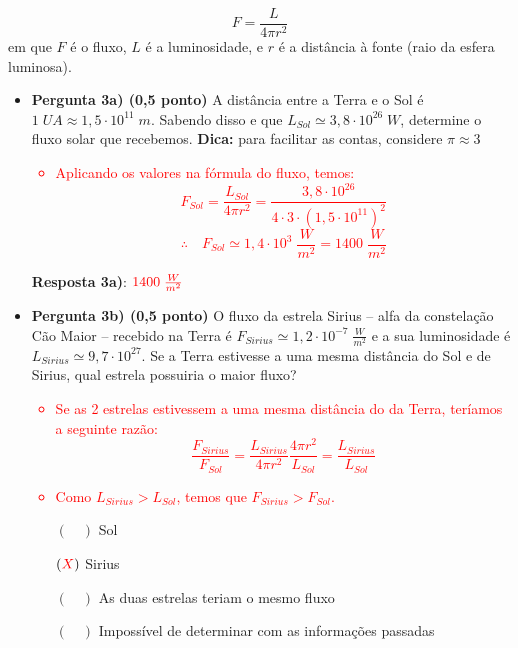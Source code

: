 \documentclass[a4paper, 12pt]{article}
\newcommand{\red}[1]{\textcolor{red}{#1}}
\begin{document}
\begin{flushleft}
\begin{itemize}
				$$F = \frac{L}{4 \pi r^2}$$
			em que $F$ é o fluxo, $L$ é a luminosidade, e $r$ é a distância à fonte (raio da esfera luminosa).
			\begin{itemize}
				\item \textbf{Pergunta 3a) (0,5 ponto)} A distância entre a Terra e o Sol é $1 \; UA \approx 1,5 \cdot 10^{11} \; m$. Sabendo disso e que $L_{Sol} \simeq 3,8 \cdot 10^{26} \; W$, determine o fluxo solar que recebemos. \linebreak
					\textbf{Dica:} para facilitar as contas, considere $\pi \approx 3$
					\red{\begin{itemize}
						\item Aplicando os valores na fórmula do fluxo, temos:
							$$F_{Sol} = \frac{L_{Sol}}{4 \pi r^2} = \frac{3,8 \cdot 10^{26}}{4 \cdot 3 \cdot (1,5 \cdot 10^{11})^2}$$
							$$\therefore \quad F_{Sol} \simeq 1,4 \cdot 10^3 \; \frac{W}{m^2} = 1400 \; \frac{W}{m^2}$$
					\end{itemize}}
					\textbf{Resposta 3a)}: $\red{1400 \; \frac{W}{m^2}}$
				\item \textbf{Pergunta 3b) (0,5 ponto)} O fluxo da estrela Sirius -- alfa da constelação Cão Maior -- recebido na Terra é $F_{Sirius} \simeq 1,2 \cdot 10^{-7} \; \frac{W}{m^2}$ e a sua luminosidade é $L_{Sirius} \simeq 9,7 \cdot 10^{27}$. Se a Terra estivesse a uma mesma distância do Sol e de Sirius, qual estrela possuiria o maior fluxo?
					\red{\begin{itemize}
						\item Se as 2 estrelas estivessem a uma mesma distância do da Terra, teríamos a seguinte razão:
							$$\frac{F_{Sirius}}{F_{Sol}} = \frac{L_{Sirius}}{4 \pi r^2} \frac{4 \pi r^2}{L_{Sol}} = \frac{L_{Sirius}}{L_{Sol}}$$
						\item Como $L_{Sirius} > L_{Sol}$, temos que $F_{Sirius} > F_{Sol}$.
					\end{itemize}}
					\begin{itemize}
						\item[$(\quad)$] Sol
						\item[$(\red{X})$] Sirius
						\item[$(\quad)$] As duas estrelas teriam o mesmo fluxo
						\item[$(\quad)$] Impossível de determinar com as informações passadas
					\end{itemize}
			\end{itemize}
			

\end{itemize}
\end{flushleft}
\end{document}
